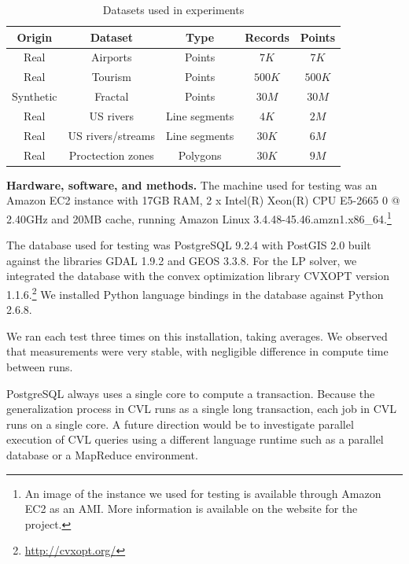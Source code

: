 \documentclass[11pt, oneside]{report}
\newcommand{\minisec}[1]{\noindent\textbf{#1.}}
\begin{document}
{\begin{table}[htdp]
\caption{Datasets used in experiments}
\label{tab:cvl:datasets}
\begin{center}
\begin{tabular}{|c|c|c|c|c|}
\hline
\textbf{Origin} & \textbf{Dataset} & \textbf{Type} & \textbf{Records} & \textbf{Points} \\
\hline
Real & Airports & Points & $7K$ & $7K$ \\
Real & Tourism & Points & $500K$ & $500K$ \\
Synthetic & Fractal & Points & $30M$ & $30M$ \\
Real & US rivers & Line segments & $4K$ & $2M$ \\
Real & US rivers/streams & Line segments & $30K$ & $6M$ \\
Real & Proctection zones & Polygons & $30K$ & $9M$ \\
\hline
\end{tabular}
\end{center}
\label{default}
\end{table}%


\minisec{Hardware, software, and methods}
The machine used for testing was an Amazon EC2 instance with 17GB RAM, 2 x Intel(R) Xeon(R) CPU E5-2665 0 @ 2.40GHz and 20MB cache, running Amazon Linux 3.4.48-45.46.amzn1.x86\_64.\footnote{An image of the instance we used for testing is available through Amazon EC2 as an AMI. More information is available on the website for the project.}

The database used for testing was PostgreSQL 9.2.4 with PostGIS  2.0 built against the libraries GDAL 1.9.2 and GEOS 3.3.8. For the LP solver, we integrated the database with the convex optimization library CVXOPT version 1.1.6.\footnote{\url{http://cvxopt.org/}} We installed Python language bindings in the database against Python 2.6.8.

We ran each test three times on this installation, taking averages. We observed that measurements were very stable, with negligible difference in compute time between runs.

PostgreSQL always uses a single core to compute a transaction. Because the generalization process in CVL runs as a single long transaction, each job in CVL runs on a single core. A future direction would be to investigate parallel execution of CVL queries using a different language runtime such as a parallel database or a MapReduce environment.

}
\end{document}

